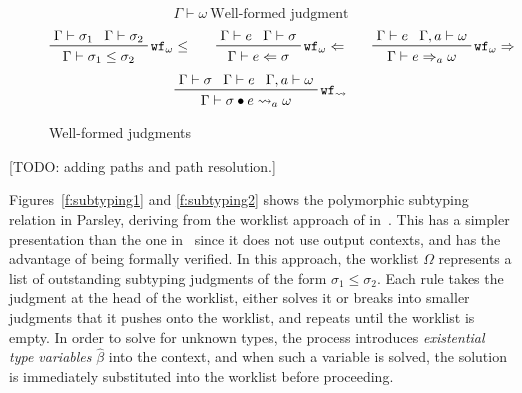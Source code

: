 \documentclass[letterpaper]{article}
\newcommand{\todo}[1]{{\color{red}[TODO: #1]}}
\newcommand{\etv}{\widehat{\beta}}    %
\begin{document}
\begin{figure}
  $$ \boxed{\Gamma\vdash\omega}\ \textrm{Well-formed judgment} $$
  $$ \prftree[r]{$\mathtt{wf_\omega \leq}$}
             {\prfassumption{\Gamma\vdash\sigma_1}}{\prfassumption{\Gamma\vdash\sigma_2}}
             {\Gamma\vdash\sigma_1\leq\sigma_2}\qquad
     \prftree[r]{$\mathtt{wf_\omega\Leftarrow}$}
             {\prfassumption{\Gamma\vdash e}}{\prfassumption{\Gamma\vdash\sigma}}
             {\Gamma\vdash e\Leftarrow\sigma}\qquad
     \prftree[r]{$\mathtt{wf_\omega\Rightarrow}$}
             {\prfassumption{\Gamma\vdash e}}{\prfassumption{\Gamma,a\vdash\omega}}
             {\Gamma\vdash e\Rightarrow_a\omega} $$
  $$ \prftree[r]{$\mathtt{wf_\rightsquigarrow}$}
             {\prfassumption{\Gamma\vdash\sigma}}{\prfassumption{\Gamma\vdash e}}
             {\prfassumption{\Gamma,a\vdash\omega}}
             {\Gamma\vdash\sigma\bullet e\rightsquigarrow_a\omega} $$

  \caption{Well-formed judgments}
  \label{f:wf:judgments}
\end{figure}

\todo{adding paths and path resolution.}

Figures~\ref{f:subtyping1} and \ref{f:subtyping2} shows the
polymorphic subtyping relation in Parsley, deriving from the worklist
approach of in~\cite{zhao2018,zhao19:bidir}.  This has a simpler
presentation than the one in~\cite{Dunfield13:bidir} since it does not
use output contexts, and has the advantage of being formally verified.
In this approach, the worklist $\Omega$ represents a list of
outstanding subtyping judgments of the form $\sigma_1\leq\sigma_2$.
Each rule takes the judgment at the head of the worklist, either
solves it or breaks into smaller judgments that it pushes onto the
worklist, and repeats until the worklist is empty.  In order to solve
for unknown types, the process introduces {\em existential type
  variables} $\etv$ into the context, and when such a variable is
solved, the solution is immediately substituted into the worklist
before proceeding.
\end{document}
